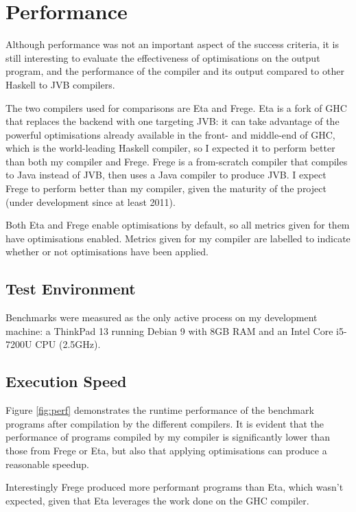 \documentclass[dissertation.tex]{subfiles}
\begin{document}
\section{Performance}
{
    Although performance was not an important aspect of the success criteria, it is still interesting to evaluate the effectiveness of optimisations on the output program, and the performance of the compiler and its output compared to other Haskell to JVB compilers.

    The two compilers used for comparisons are Eta and Frege. Eta is a fork of GHC that replaces the backend with one targeting JVB: it can take advantage of the powerful optimisations already available in the front- and middle-end of GHC, which is the world-leading Haskell compiler, so I expected it to perform better than both my compiler and Frege. Frege is a from-scratch compiler that compiles to Java instead of JVB, then uses a Java compiler to produce JVB. I expect Frege to perform better than my compiler, given the maturity of the project (under development since at least 2011).

    Both Eta and Frege enable optimisations by default, so all metrics given for them have optimisations enabled. Metrics given for my compiler are labelled to indicate whether or not optimisations have been applied.

    \subsection{Test Environment}\label{sec:test-environment}
    {
        Benchmarks were measured as the only active process on my development machine: a ThinkPad 13 running Debian 9 with 8GB RAM and an Intel Core i5-7200U CPU (2.5GHz).
    }
    \subsection{Execution Speed}
    {
        Figure \ref{fig:perf} demonstrates the runtime performance of the benchmark programs after compilation by the different compilers. It is evident that the performance of programs compiled by my compiler is significantly lower than those from Frege or Eta, but also that applying optimisations can produce a reasonable speedup.

        Interestingly Frege produced more performant programs than Eta, which wasn't expected, given that Eta leverages the work done on the GHC compiler.

}}
\end{document}
